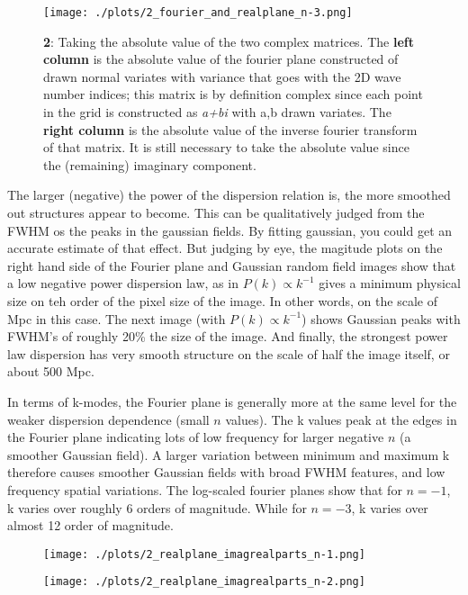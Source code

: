 \begin{figure}[h!]
  \centering
  \texttt{[image: ./plots/2\_fourier\_and\_realplane\_n-3.png]}
  \caption{\textbf{2}: Taking the absolute value of the two complex matrices. The \textbf{left column} is the absolute value of the fourier plane constructed of drawn normal variates with variance that goes with the 2D wave number indices; this matrix is by definition complex since each point in the grid is constructed as \textit{a+bi} with a,b drawn variates. The \textbf{right column} is the absolute value of the inverse fourier transform of that matrix. It is still necessary to take the absolute value since the (remaining) imaginary component.}
  \label{fig:abs}
\end{figure}


The larger (negative) the power of the dispersion relation is, the more smoothed out structures appear to become. This can be qualitatively judged from the FWHM os the peaks in the gaussian fields. By fitting gaussian, you could get an accurate estimate of that effect. But judging by eye, the magitude plots on the right hand side of the Fourier plane and Gaussian random field images show that a low negative power dispersion law, as in $P(k) \propto k^{-1}$ gives a minimum physical size on teh order of the pixel size of the image. In other words, on the scale of Mpc in this case. The next image (with $P(k) \propto k^{-1}$) shows Gaussian peaks with FWHM's of roughly 20\% the size of the image. And finally, the strongest power law dispersion has very smooth structure on the scale of half the image itself, or about 500 Mpc.

In terms of k-modes, the Fourier plane is generally more at the same level for the weaker dispersion dependence (small $n$ values). The k values peak at the edges in the Fourier plane indicating lots of low frequency for larger negative $n$ (a smoother Gaussian field). A larger variation between minimum and maximum k therefore causes smoother Gaussian fields with broad FWHM features, and low frequency spatial variations. The log-scaled fourier planes show that for $n=-1$, k varies over roughly 6 orders of magnitude. While for $n=-3$, k varies over almost 12 order of magnitude.

\begin{figure}[h!]
  \centering
  \texttt{[image: ./plots/2\_realplane\_imagrealparts\_n-1.png]}
  \label{fig:imagrealparts}
\end{figure}

\begin{figure}[h!]
  \centering
  \texttt{[image: ./plots/2\_realplane\_imagrealparts\_n-2.png]}
  \label{fig:imagrealparts}
\end{figure}

